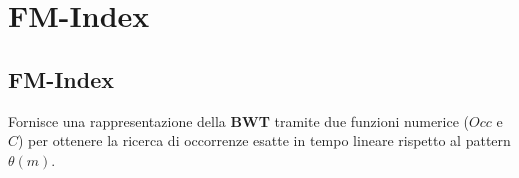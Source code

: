 \chapter{FM-Index}

\section{FM-Index}

Fornisce una rappresentazione della \textbf{BWT} tramite due funzioni numerice ($Occ$ e $C$) per ottenere la ricerca di occorrenze esatte in tempo lineare rispetto al pattern $\theta(m)$.

